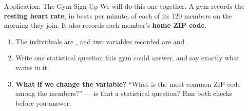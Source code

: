 \boxguard[14]
\begin{notesbox}{Application: The Gym Sign-Up}
We will do this one together. A gym records the \textbf{resting heart rate}, in beats per
minute, of each of its 120 members on the morning they join. It also records each member's
\textbf{home ZIP code}.

\begin{enumerate}[label=\textbf{\alph*.}, leftmargin=1.8em, itemsep=7pt]
  \item The individuals are \blank{6.4cm}, and two variables recorded are
        \blank{4.0cm} and \blank{4.0cm}.
  \item Write one statistical question this gym could answer, and say exactly what varies in it.
        \answerspace{1.8cm}{}
  \item \textbf{What if we change the variable?} ``What is the most common ZIP code among the
        members?'' --- is that a statistical question? Run both checks before you answer.
        \answerspace{2.2cm}{}
\end{enumerate}
\end{notesbox}

